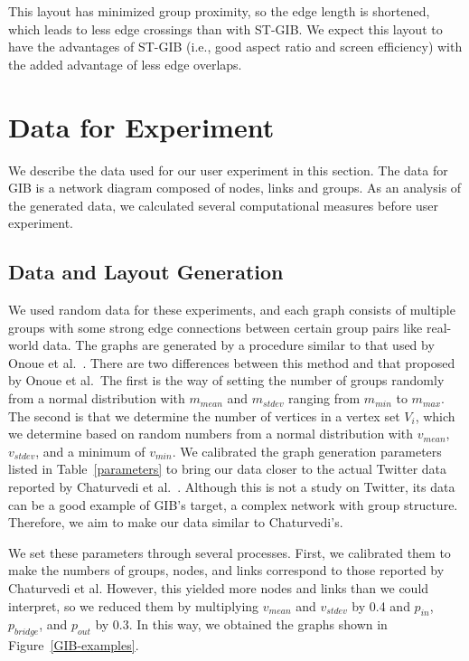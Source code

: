 \documentclass[review]{vgtc}                 %
\begin{document}
This layout has minimized group proximity, so the edge length is shortened, which leads to less edge crossings than with ST-GIB.
We expect this layout to have the advantages of ST-GIB (i.e., good aspect ratio and screen efficiency) with the added advantage of less edge overlaps.

\section{Data for Experiment}

We describe the data used for our user experiment in this section.
The data for GIB is a network diagram composed of nodes, links and groups.
As an analysis of the generated data, we calculated several computational measures before user experiment.

\subsection{Data and Layout Generation}
\label{layout}

We used random data for these experiments, and each graph consists of multiple groups with some strong edge connections between certain group pairs like real-world data.
The graphs are generated by a procedure similar to that used by Onoue et al.~\cite{onoue2017optimal}.
There are two differences between this method and that proposed by Onoue et al.\ The first is the way of setting the number of groups randomly from a normal distribution with $m_{mean}$ and $m_{stdev}$ ranging from $m_{min}$ to $m_{max}$.
The second is that we determine the number of vertices in a vertex set $V_i$, which we determine based on random numbers from a normal distribution with $v_{mean}$, $v_{stdev}$, and a minimum of $v_{min}$.
We calibrated the graph generation parameters listed in Table~\ref{parameters} to bring our data closer to the actual Twitter data reported by Chaturvedi et al.~\cite{chaturvedi2014group}.
Although this is not a study on Twitter, its data can be a good example of GIB's target, a complex network with group structure.
Therefore, we aim to make our data similar to Chaturvedi's.

We set these parameters through several processes.
First, we calibrated them to make the numbers of groups, nodes, and links correspond to those reported by Chaturvedi et al.
However, this yielded more nodes and links than we could interpret, so we reduced them by multiplying $v_{mean}$ and $v_{stdev}$ by 0.4 and $p_{in}$, $p_{bridge}$, and $p_{out}$ by 0.3.
In this way, we obtained the graphs shown in Figure~\ref{GIB-examples}.
\end{document}
